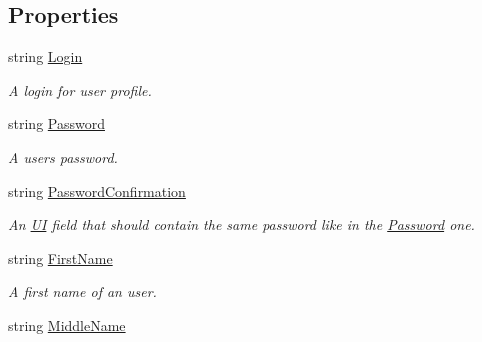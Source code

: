 \subsection*{Properties}
\begin{DoxyCompactItemize}
\item 
string \mbox{\hyperlink{class_wpf_handler_1_1_u_i_1_1_controls_1_1_logon_1_1_default_registration_panel_descriptor_a4be5b2a0ce4dcbd9c596057b5bbeb8ce}{Login}}
\begin{DoxyCompactList}\small\item\em A login for user profile. \end{DoxyCompactList}\item 
string \mbox{\hyperlink{class_wpf_handler_1_1_u_i_1_1_controls_1_1_logon_1_1_default_registration_panel_descriptor_ac525bd60f8febfaa251aeaebed55f515}{Password}}
\begin{DoxyCompactList}\small\item\em A user\textquotesingle{}s password. \end{DoxyCompactList}\item 
string \mbox{\hyperlink{class_wpf_handler_1_1_u_i_1_1_controls_1_1_logon_1_1_default_registration_panel_descriptor_a6779df49ec2d45ee293929f3e7bafcf6}{Password\+Confirmation}}
\begin{DoxyCompactList}\small\item\em An \mbox{\hyperlink{namespace_wpf_handler_1_1_u_i}{UI}} field that should contain the same password like in the \mbox{\hyperlink{class_wpf_handler_1_1_u_i_1_1_controls_1_1_logon_1_1_default_registration_panel_descriptor_ac525bd60f8febfaa251aeaebed55f515}{Password}} one. \end{DoxyCompactList}\item 
string \mbox{\hyperlink{class_wpf_handler_1_1_u_i_1_1_controls_1_1_logon_1_1_default_registration_panel_descriptor_a10f8af981d1154451adbc5896f53ffca}{First\+Name}}
\begin{DoxyCompactList}\small\item\em A first name of an user. \end{DoxyCompactList}\item 
string \mbox{\hyperlink{class_wpf_handler_1_1_u_i_1_1_controls_1_1_logon_1_1_default_registration_panel_descriptor_a2a57913c309a9fb31fe5d4d9b0d6b7c6}{Middle\+Name}}

\end{DoxyCompactItemize}
